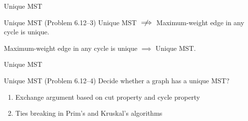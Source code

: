 \begin{frame}{Unique MST}
  \begin{exampleblock}{Unique MST (Problem 6.12--3)}
    Unique MST $\centernot\implies$ Maximum-weight edge in any cycle is unique.
  \end{exampleblock}


  \begin{theorem}[Conjecture]
	Maximum-weight edge in any cycle is unique $\implies$ Unique MST.
  \end{theorem}

\end{frame}
\begin{frame}{Unique MST}
  \begin{exampleblock}{Unique MST (Problem 6.12--4)}
	Decide whether a graph has a unique MST?
  \end{exampleblock}

  \vspace{0.60cm}
  \begin{enumerate}
	\item Exchange argument based on cut property and cycle property
	\item Ties breaking in Prim's and Kruskal's algorithms
  \end{enumerate}
\end{frame}
